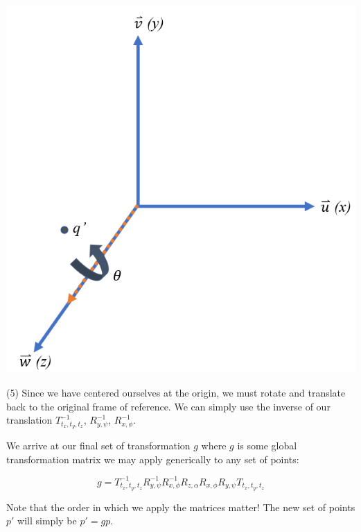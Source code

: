 \documentclass[12pt,letterpaper]{article}
\begin{document}
\begin{center}
\includegraphics[scale=0.75]{rot5}
\end{center}

(5) Since we have centered ourselves at the origin, we must rotate and translate back to the original frame of reference. We can simply use the inverse of our translation $T^{-1}_{t_x, t_y, t_z}$, $R^{-1}_{y, \psi}$, $R^{-1}_{x, \phi}$.

We arrive at our final set of transformation $g$ where $g$ is some global transformation matrix we may apply generically to any set of points:

\begin{equation}
    g = T^{-1}_{t_x, t_y, t_z}
        R^{-1}_{y, \psi}
        R^{-1}_{x, \phi}
        R_{z, \alpha}
        R_{x, \phi}
        R_{y, \psi}
        T_{t_x, t_y, t_z}
\end{equation}

Note that the order in which we apply the matrices matter! The new set of points $p'$ will simply be $p' = gp$.
\end{document}

